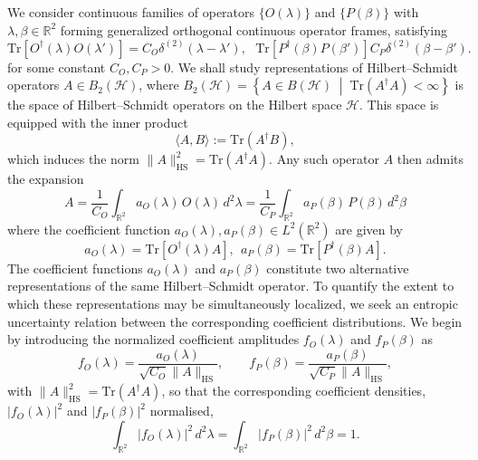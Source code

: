 \documentclass[aps,pra,onecolumn,nofootinbib,superscriptaddress,showpacs]{revtex4}
\begin{document}
We consider continuous families of operators
$\{O(\lambda)\}$ and
$\{P(\beta)\}$ with $\lambda,\beta\in\mathbb R^2$ forming generalized orthogonal
continuous operator frames, satisfying
\begin{equation}
\mathrm{Tr}\!\left[O^\dagger(\lambda) O(\lambda')\right]
=C_O\delta^{(2)}(\lambda - \lambda'),~~~\mathrm{Tr}\!\left[P^\dagger(\beta) P(\beta')\right]
C_P\delta^{(2)}(\beta - \beta').
\end{equation}
for some constant $C_O, C_P > 0$. 
We shall study representations of Hilbert--Schmidt operators
$A\in B_2(\mathcal H)$, where $B_2(\mathcal H)
=
\left\{
A\in B(\mathcal H)
\;\middle|\;
\mathrm{Tr}(A^\dagger A)<\infty
\right\}
$
is the space of Hilbert–Schmidt operators on the Hilbert space $\mathcal H$. This space is equipped with the inner product
\begin{equation}
\langle A, B \rangle := \mathrm{Tr}(A^\dagger B),
\end{equation}
which induces the norm $\|A\|_{\mathrm{HS}}^2 = \mathrm{Tr}(A^\dagger A)$.
Any such operator $A$ then admits the expansion
\begin{equation}\label{expA}
A = \frac{1}{C_O} \int_{\mathbb{R}^2} a_O(\lambda)\, O(\lambda)\, d^2\lambda=\frac{1}{C_P} \int_{\mathbb{R}^2} a_P(\beta)\, P(\beta)\, d^2\beta
\end{equation}
where the coefficient function $a_O(\lambda),a_P(\beta) \in L^2(\mathbb{R}^2)$ are given by
\begin{equation}\label{coeff}
a_O(\lambda) = \mathrm{Tr}\!\left[O^\dagger(\lambda) A\right],~~a_P(\beta) = \mathrm{Tr}\!\left[P^\dagger(\beta) A\right].
\end{equation}
The coefficient functions \(a_O(\lambda)\) and \(a_P(\beta)\) constitute two alternative representations of the same Hilbert--Schmidt operator. To quantify the extent to which these representations may be simultaneously localized, we seek an entropic uncertainty relation between the corresponding coefficient distributions. We begin by introducing the normalized coefficient amplitudes
\(f_O(\lambda)\) and \(f_P(\beta)\) as
\begin{equation}\label{fofp}
f_O(\lambda)
=
\frac{a_O(\lambda)}
{\sqrt{C_O}\|A\|_{\mathrm{HS}}},
\qquad
f_P(\beta)
=
\frac{a_P(\beta)}
{\sqrt{C_P}\|A\|_{\mathrm{HS}}},
\end{equation}
with $\|A\|_{\mathrm{HS}}^2
=
\mathrm{Tr}(A^\dagger A)$,
so that the corresponding coefficient densities, $|f_O(\lambda)|^2$ and $|f_P(\beta)|^2$ normalised,
\begin{equation}\label{endpoint2}
\int_{\mathbb R^2}|f_O(\lambda)|^2\,d^2\lambda
=
\int_{\mathbb R^2}|f_P(\beta)|^2\,d^2\beta
=
1.
\end{equation}
\end{document}
